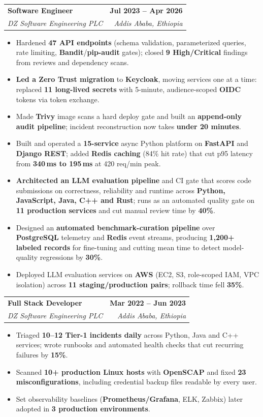 \documentclass[letterpaper,11pt]{article}
\makeatletter
\newcommand{\resumeItem}[1]{
  \item\small{
    {#1 \vspace{-2.5pt}}
  }
}
\newcommand{\resumeSubheading}[4]{
  \vspace{-0.01pt}\item
    \begin{tabular*}{1.0\textwidth}[t]{l@{\extracolsep{\fill}}r}
      \textbf{#1} & \textbf{\small #2} \\
      \textit{\small#3} & \textit{\small #4} \\
    \end{tabular*}\vspace{-7pt}
}
\newcommand{\resumeItemListStart}{\begin{itemize}}
\newcommand{\resumeItemListEnd}{\end{itemize}\vspace{-5pt}}
\makeatother
\begin{document}
    \resumeSubheading
      {Software Engineer}{Jul 2023 -- Apr 2026}
      {DZ Software Engineering PLC}{Addis Ababa, Ethiopia}
      \resumeItemListStart
        \resumeItem{Hardened \textbf{47 API endpoints} (schema validation, parameterized queries, rate limiting, \textbf{Bandit}/\textbf{pip-audit} gates); closed \textbf{9 High/Critical} findings from reviews and dependency scans.}
        \resumeItem{\textbf{Led a Zero Trust migration} to \textbf{Keycloak}, moving services one at a time: replaced \textbf{11 long-lived secrets} with 5-minute, audience-scoped \textbf{OIDC} tokens via token exchange.}
        \resumeItem{Made \textbf{Trivy} image scans a hard deploy gate and built an \textbf{append-only audit pipeline}; incident reconstruction now takes \textbf{under 20 minutes}.}
        \resumeItem{Built and operated a \textbf{15-service} async Python platform on \textbf{FastAPI} and \textbf{Django REST}; added \textbf{Redis caching} (84\% hit rate) that cut p95 latency from \textbf{340\,ms to 195\,ms} at 420 req/min peak.}
        \resumeItem{\textbf{Architected an LLM evaluation pipeline} and CI gate that scores code submissions on correctness, reliability and runtime across \textbf{Python, JavaScript, Java, C++ and Rust}; runs as an automated quality gate on \textbf{11 production services} and cut manual review time by \textbf{40\%}.}
        \resumeItem{Designed an \textbf{automated benchmark-curation pipeline} over \textbf{PostgreSQL} telemetry and \textbf{Redis} event streams, producing \textbf{1,200+ labeled records} for fine-tuning and cutting mean time to detect model-quality regressions by \textbf{30\%}.}
        \resumeItem{Deployed LLM evaluation services on \textbf{AWS} (EC2, S3, role-scoped IAM, VPC isolation) across \textbf{11 staging/production pairs}; rollback time fell \textbf{35\%}.}
      \resumeItemListEnd

    \resumeSubheading
      {Full Stack Developer}{Mar 2022 -- Jun 2023}
      {DZ Software Engineering PLC}{Addis Ababa, Ethiopia}
      \resumeItemListStart
        \resumeItem{Triaged \textbf{10--12 Tier-1 incidents daily} across Python, Java and C++ services; wrote runbooks and automated health checks that cut recurring failures by \textbf{15\%}.}
        \resumeItem{Scanned \textbf{10+ production Linux hosts} with \textbf{OpenSCAP} and fixed \textbf{23 misconfigurations}, including credential backup files readable by every user.}
        \resumeItem{Set observability baselines (\textbf{Prometheus/Grafana}, ELK, Zabbix) later adopted in \textbf{3 production environments}.}
      \resumeItemListEnd
\end{document}
